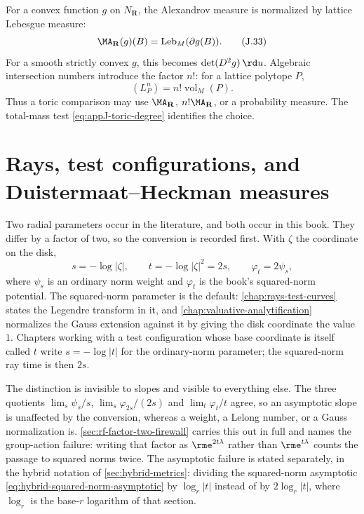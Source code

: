 For a convex function \(g\) on \(N_{\mathbf R}\), the Alexandrov measure is
normalized by lattice Lebesgue measure:
\begin{equation*}
 \MA_{\mathbf R}(g)(B)
 =\operatorname{Leb}_M(\partial g(B)).
 \tag{J.33}\label{eq:appJ-alexandrov}
\end{equation*}
For a smooth strictly convex \(g\), this becomes
\(\det(D^2g)\,\rd u\).  Algebraic intersection numbers introduce the factor
\(n!\): for a lattice polytope \(P\),
\begin{equation*}
 (L_P^n)=n!\operatorname{vol}_M(P).
 \tag{J.34}\label{eq:appJ-toric-degree}
\end{equation*}
Thus a toric comparison may use \(\MA_{\mathbf R}\),
\(n!\MA_{\mathbf R}\), or a probability measure.  The total-mass test
\eqref{eq:appJ-toric-degree} identifies the choice.

\section{Rays, test configurations, and Duistermaat--Heckman measures}
\label{sec:appJ-rays}

Two radial parameters occur in the literature, and both occur in this book.
They differ by a factor of two, so the conversion is recorded first.  With
\(\zeta\) the coordinate on the disk,
\begin{equation*}
 s=-\log|\zeta|,
 \qquad
 t=-\log|\zeta|^2=2s,
 \qquad
 \varphi_t=2\psi_s,
 \tag{J.35}\label{eq:appJ-radial-parameter}
\end{equation*}
where \(\psi_s\) is an ordinary norm weight and \(\varphi_t\) is the book's
squared-norm potential.  The squared-norm parameter is the default:
\cref{chap:rays-test-curves} states the Legendre transform in it, and
\cref{chap:valuative-analytification} normalizes the Gauss extension against
it by giving the disk coordinate the value \(1\).  Chapters working with a
test configuration whose base coordinate is itself called \(t\) write
\(s=-\log|t|\) for the ordinary-norm parameter; the squared-norm ray time is
then \(2s\).

The distinction is invisible to slopes and visible to everything else.  The
three quotients
\(\lim_s\psi_s/s\), \(\lim_s\varphi_{2s}/(2s)\) and \(\lim_t\varphi_t/t\)
agree, so an asymptotic slope is unaffected by the conversion, whereas a
weight, a Lelong number, or a Gauss normalization is.
\cref{sec:rf-factor-two-firewall} carries this out in full and names the
group-action failure: writing that factor as \(\rme^{2t\lambda}\) rather
than \(\rme^{t\lambda}\) counts the passage to squared norms twice.  The
asymptotic failure is stated separately, in the hybrid notation of
\cref{sec:hybrid-metrics}: dividing the squared-norm asymptotic
\eqref{eq:hybrid-squared-norm-asymptotic} by \(\log_r|t|\) instead of by
\(2\log_r|t|\), where \(\log_r\) is the base-\(r\) logarithm of that
section.

